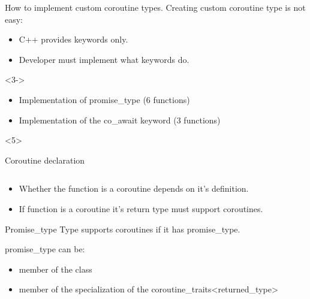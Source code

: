 \documentclass[10pt]{beamer}
\begin{document}
\begin{frame}{How to implement custom coroutine types.}
	Creating custom coroutine type is not easy:
	\begin{itemize}[<+->]
		\item C++ provides keywords \alert{only}.
		\item \alert{Developer must implement} what keywords do.
	\end{itemize}

	\vfill

	<3->
	\begin{itemize}[<+->]
		\item Implementation of promise\_type ({\selectfont\texttildelow}6 functions)
		\item Implementation of the co\_await  keyword ({\selectfont\texttildelow}3 functions)
	\end{itemize}

	\vfill

\end{frame}

\begin{frame}{Coroutine declaration}
  \vfill
  \begin{center}
  \begin{minipage}{0.8\linewidth}
  \inputminted{c++}{code-examples/intro/declaration.hpp}
  \end{minipage}
  \end{center}
  \vfill

  \begin{itemize}[<+->]
  	\item Whether the function is a coroutine depends on \alert{it's definition}.
  	\item If function is a coroutine it's \alert{return type must support coroutines}.
  \end{itemize}
  
\end{frame}

\begin{frame}{Promise\_type}
	Type supports coroutines \alert{if it has promise\_type}.
	\vfill

	promise\_type can be:
	\begin{itemize}
		\item member of the class
		\item member of the specialization of the coroutine\_traits<returned\_type>
	\end{itemize}
\end{frame}
\end{document}
